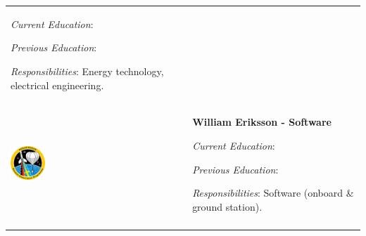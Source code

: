 \begin{longtable}[]{m{} m{}}
\smallskip
\textit{Current Education}: 

\smallskip
\textit{Previous Education}:

\smallskip
\textit{Responsibilities}: Energy technology, electrical engineering.
\bigskip
\\
 \includegraphics[width=0.2\textwidth]{0-cover/img/logo-rexus-bexus.png}  & \textbf{William Eriksson - Software}

\smallskip
\textit{Current Education}: 

\smallskip
\textit{Previous Education}:

\smallskip
\textit{Responsibilities}: Software (onboard \& ground station).
\bigskip
\\
\label{tab:people}
\end{longtable}
\raggedbottom
